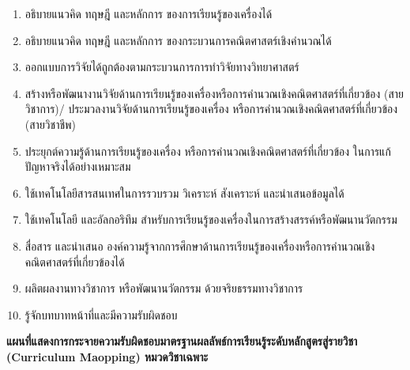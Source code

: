 \begin{enumerate}[label=PLO\arabic*., leftmargin=3\parindent]
	\item อธิบายแนวคิด ทฤษฎี และหลักการ ของการเรียนรู้ของเครื่องได้
	\item อธิบายแนวคิด ทฤษฎี และหลักการ ของกระบวนการคณิตศาสตร์เชิงคำนวณได้
	\item ออกแบบการวิจัยได้ถูกต้องตามกระบวนการการทำวิจัยทางวิทยาศาสตร์ 
	\item สร้างหรือพัฒนางานวิจัยด้านการเรียนรู้ของเครื่องหรือการคำนวณเชิงคณิตศาสตร์ที่เกี่ยวข้อง (สายวิชาการ)/ ประมวลงานวิจัยด้านการเรียนรู้ของเครื่อง หรือการคำนวณเชิงคณิตศาสตร์ที่เกี่ยวข้อง (สายวิชาชีพ) 
	\item ประยุกต์ความรู้ด้านการเรียนรู้ของเครื่อง หรือการคำนวณเชิงคณิตศาสตร์ที่เกี่ยวข้อง ในการแก้ปัญหาจริงได้อย่างเหมาะสม
	\item ใช้เทคโนโลยีสารสนเทศในการรวบรวม วิเคราะห์ สังเคราะห์ และนำเสนอข้อมูลได้
	\item ใช้เทคโนโลยี และอัลกอริทึม สำหรับการเรียนรู้ของเครื่องในการสร้างสรรค์หรือพัฒนานวัตกรรม
	\item สื่อสาร และนำเสนอ องค์ความรู้จากการศึกษาด้านการเรียนรู้ของเครื่องหรือการคำนวณเชิงคณิตศาสตร์ที่เกี่ยวข้องได้
	\item ผลิตผลงานทางวิชาการ หรือพัฒนานวัตกรรม ด้วยจริยธรรมทางวิชาการ
	\item รู้จักบทบาทหน้าที่และมีความรับผิดชอบ
\end{enumerate}


\newpage
\begin{landscape}
\begin{center}
\textbf{\large แผนที่แสดงการกระจายความรับผิดชอบมาตรฐานผลลัพธ์การเรียนรู้ระดับหลักสูตรสู่รายวิชา (Curriculum Maopping) หมวดวิชาเฉพาะ}
\par\bigskip
	
\end{center}	
\end{landscape}




 
 
 
 
 
 
 
 
 
 